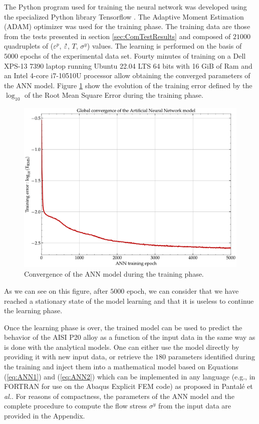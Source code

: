 \documentclass[twoside,english,1p,final,sort&compress]{elsarticle}
\makeatletter
\theoremstyle{plain}
\DeclareRobustCommand{\mdot}[1]{\accentset{\mbox{\bfseries .}}{#1}}
\DeclareRobustCommand{\eal}{et \emph{al.}\@\xspace}
\DeclareRobustCommand{\eg}{e.g.,\@\xspace}
\makeatother
\begin{document}
The Python program used for training the neural network was developed using the specialized Python library Tensorflow \cite{Abadi-2016}.
The Adaptive Moment Estimation (ADAM) optimizer \cite{Kingma-2015} was used for the training phase.
The training data are those from the tests presented in section \ref{sec:ComTestResults} and composed of $21000$ quadruplets of ($\varepsilon^p$, $\mdot\varepsilon$, $T$, $\sigma^y$) values.
The learning is performed on the basis of $5000$ epochs of the experimental data set.
Fourty minutes of training on a Dell XPS-13 7390 laptop running Ubuntu 22.04 LTS 64 bits with 16 GiB of Ram and an Intel 4-core i7-10510U processor allow obtaining the converged parameters of the ANN model.
Figure \ref{fig:ANN-6-conv} show the evolution of the training error defined by the $\log_{10}$ of the Root Mean Square Error during the training phase.
\begin{figure}[!ht]
\centering
\includegraphics[width=0.7\columnwidth]
{Figures/Conv-ANN-6}
\caption{Convergence of the ANN model during the training phase.}
\label{fig:ANN-6-conv}
\end{figure}
As we can see on this figure, after $5000$ epoch, we can consider that we have reached a stationary state of the model learning and that it is useless to continue the learning phase.

Once the learning phase is over, the trained model can be used to predict the behavior of the AISI P20 alloy as a function of the input data in the same way as is done with the analytical models.
One can either use the model directly by providing it with new input data, or retrieve the $180$ parameters identified during the training and inject them into a mathematical model based on Equations (\ref{eq:ANN1}) and (\ref{eq:ANN2}) which can be implemented in any language (\eg in FORTRAN for use on the Abaqus Explicit FEM code) as proposed in Pantalé \eal \cite{Pantale-2021}.
For reasons of compactness, the parameters of the ANN model and the complete procedure to compute the flow stress $\sigma^y$ from the input data are provided in the Appendix.
\end{document}
